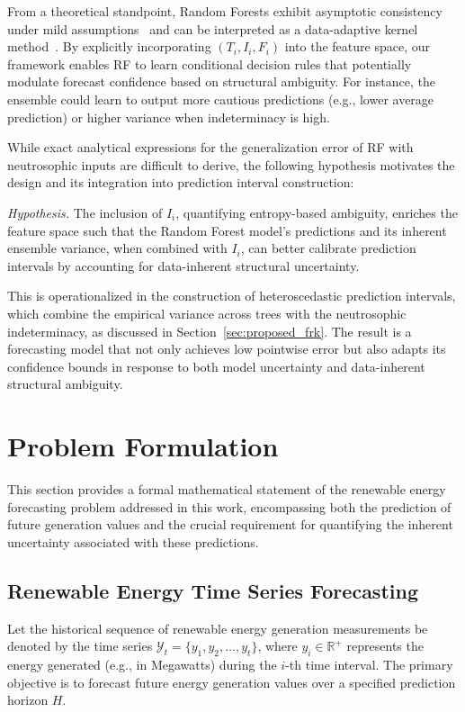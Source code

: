 \documentclass[review,3p,times]{elsarticle}
\begin{document}
From a theoretical standpoint, Random Forests exhibit asymptotic consistency under mild assumptions~\cite{biau2012analysis} and can be interpreted as a data-adaptive kernel method~\cite{scornet2015consistency}. By explicitly incorporating $(T_i, I_i, F_i)$ into the feature space, our framework enables RF to learn conditional decision rules that potentially modulate forecast confidence based on structural ambiguity. For instance, the ensemble could learn to output more cautious predictions (e.g., lower average prediction) or higher variance when indeterminacy is high.

While exact analytical expressions for the generalization error of RF with neutrosophic inputs are difficult to derive, the following hypothesis motivates the design and its integration into prediction interval construction:

\textit{Hypothesis.} The inclusion of $I_i$, quantifying entropy-based ambiguity, enriches the feature space such that the Random Forest model's predictions and its inherent ensemble variance, when combined with $I_i$, can better calibrate prediction intervals by accounting for data-inherent structural uncertainty.

This is operationalized in the construction of heteroscedastic prediction intervals, which combine the empirical variance across trees with the neutrosophic indeterminacy, as discussed in Section~\ref{sec:proposed_frk}. The result is a forecasting model that not only achieves low pointwise error but also adapts its confidence bounds in response to both model uncertainty and data-inherent structural ambiguity.


\section{Problem Formulation}
\label{sec:problem_formulation}

This section provides a formal mathematical statement of the renewable energy forecasting problem addressed in this work, encompassing both the prediction of future generation values and the crucial requirement for quantifying the inherent uncertainty associated with these predictions.

\subsection{Renewable Energy Time Series Forecasting}

Let the historical sequence of renewable energy generation measurements be denoted by the time series $\mathcal{Y}_t = \{y_1, y_2, \dots, y_t\}$, where $y_i \in \mathbb{R}^+$ represents the energy generated (e.g., in Megawatts) during the $i$-th time interval. The primary objective is to forecast future energy generation values over a specified prediction horizon $H$.
\end{document}
